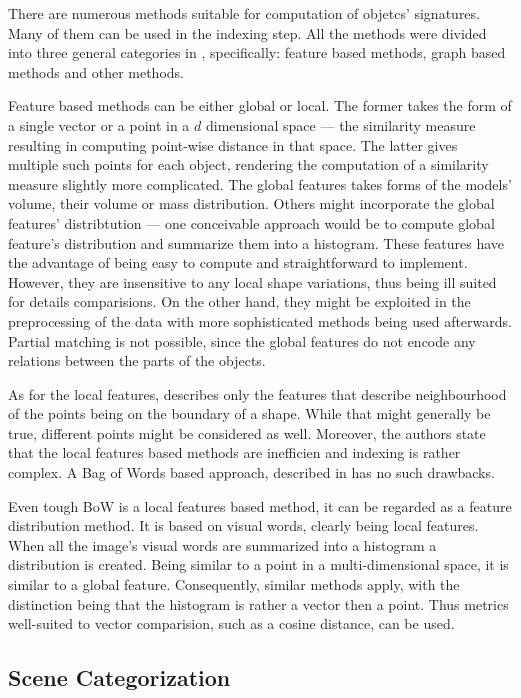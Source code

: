 \documentclass[a4paper,12pt]{article}
\begin{document}
  There are numerous methods suitable for computation of objetcs' signatures. Many of them can be used in the indexing step. All the methods were divided into three general categories in \cite{toldo2009bag}, specifically: feature based methods, graph based methods and other methods. 
   
  Feature based methods can be either global or local. The former takes the form of a single vector or a point in a $d$ dimensional space --- the similarity measure resulting in computing point-wise distance in that space. The latter gives multiple such points for each object, rendering the computation of a similarity measure slightly more complicated. The global features takes forms of the models' volume, their volume or mass distribution. Others might incorporate the global features' distribtution --- one conceivable approach would be to compute global feature's distribution and summarize them into a histogram. These features have the advantage of being easy to compute and straightforward to implement. However, they are insensitive to any local shape variations, thus being ill suited for details comparisions. On the other hand, they might be exploited in the preprocessing of the data with more sophisticated methods being used afterwards. Partial matching is not possible, since the global features do not encode any relations between the parts of the objects.
   
  As for the local features, \cite{toldo2009bag} describes only the features that describe neighbourhood of the points being on the boundary of a shape. While that might generally be true, different points might be considered as well. Moreover, the authors state that the local features based methods are inefficien and indexing is rather complex. A Bag of Words based approach, described in \cite{li2010investigating} has no such drawbacks.
   
  Even tough BoW is a local features based method, it can be regarded as a feature distribution method. It is based on visual words, clearly being local features. When all the image's visual words are summarized into a histogram a distribution is created. Being similar to a point in a multi-dimensional space, it is similar to a global feature. Consequently, similar methods apply, with the distinction being that the histogram is rather a vector then a point. Thus metrics well-suited to vector comparision, such as a cosine distance, can be used.
  
  \subsection{Scene Categorization}
  
\end{document}
